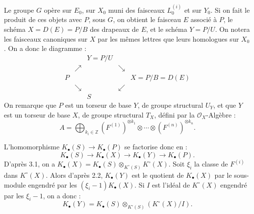 Le
groupe $G$ opère sur $E_0$, sur $X_0$ muni des faisceaux $L_0^{(i)}$ et sur $Y_0$. Si on fait le produit de ces objets avec $P$, sous $G$, on obtient le faisceau $E$ associé à $P$, le schéma $X=D(E)=P/B$ des drapeaux de $E$, et le schéma $Y=P/U$. On notera les faisceaux canoniques sur $X$ par les mêmes lettres que leurs homologues sur $X_0$. On a donc le diagramme :
\[
\begin{array}{ccccc}
&& Y=P/U &&\\[-0.2em]
& \nearrow && \searrow &\\[-0.2em]
P &&&& X=P/B=D(E)\\[-0.2em]
& \searrow && \swarrow &\\[-0.2em]
&& S &&
\end{array}
\]
On remarque que $P$ est un torseur de base $Y$, de groupe structural $U_Y$, et que $Y$ est un torseur de base $X$, de groupe structural $T_X$, défini par la $\mathcal O_X$-Algèbre :
\[
A=\bigoplus_{k_i\in\mathbb Z}(F^{(1)})^{\otimes k_1}\otimes\cdots\otimes(F^{(n)})^{\otimes k_n}.
\]

L'homomorphisme $K_\bullet(S)\to K_\bullet(P)$ se factorise donc en :
\[
K_\bullet(S)\longrightarrow K_\bullet(X)\longrightarrow K_\bullet(Y)\longrightarrow K_\bullet(P).
\]
D'après 3.1, on a $K_\bullet(X)=K_\bullet(S)\otimes_{K^\circ(S)}K^\circ(X)$. Soit $\xi_i$ la classe de $F^{(i)}$ dans $K^\circ(X)$. Alors d'après 2.2, $K_\bullet(Y)$ est le quotient de $K_\bullet(X)$ par le sous-module engendré par les $(\xi_i-1)K_\bullet(X)$. Si $I$ est l'idéal de $K^\circ(X)$ engendré par les $\xi_i-1$, on a donc :
\[
K_\bullet(Y)=K_\bullet(S)\otimes_{K^\circ(S)}(K^\circ(X)/I).
\]
